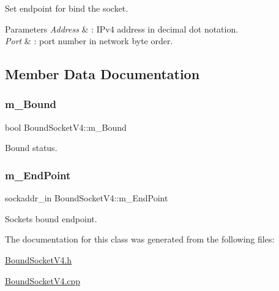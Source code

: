 Set endpoint for bind the socket. 
\begin{DoxyParams}{Parameters}
{\em Address} & \+: I\+Pv4 address in decimal dot notation. \\
\hline
{\em Port} & \+: port number in network byte order. \\
\hline
\end{DoxyParams}


\subsection{Member Data Documentation}
\mbox{\label{classBoundSocketV4_a88412526307c31c1843010e5aad30dc7}} 
\subsubsection{\texorpdfstring{m\+\_\+\+Bound}{m\_Bound}}
{\footnotesize\ttfamily bool Bound\+Socket\+V4\+::m\+\_\+\+Bound\hspace{0.3cm}{\ttfamily [protected]}}



Bound status. 

\mbox{\label{classBoundSocketV4_ac19d591b590885f2d34c4b49ba8672db}} 
\subsubsection{\texorpdfstring{m\+\_\+\+End\+Point}{m\_EndPoint}}
{\footnotesize\ttfamily sockaddr\+\_\+in Bound\+Socket\+V4\+::m\+\_\+\+End\+Point\hspace{0.3cm}{\ttfamily [protected]}}



Socket\textquotesingle{}s bound endpoint. 



The documentation for this class was generated from the following files\+:\begin{DoxyCompactItemize}
\item 
\hyperlink{BoundSocketV4_8h}{Bound\+Socket\+V4.\+h}\item 
\hyperlink{BoundSocketV4_8cpp}{Bound\+Socket\+V4.\+cpp}\end{DoxyCompactItemize}
